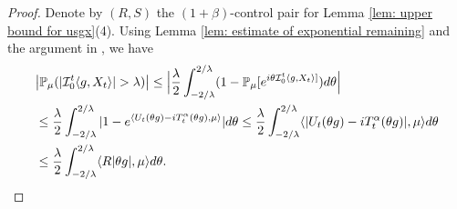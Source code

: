 \documentclass[12pt]{amsart}
\theoremstyle{plain}
\theoremstyle{definition}
\numberwithin{equation}{section}
\begin{document}
\begin{proof}
    Denote by $(R,S)$ the $(1+\beta)$-control pair for Lemma \ref{lem: upper bound for usgx}(4).
    Using Lemma \ref{lem: estimate of exponential remaining} and the argument in \cite[Proof of Theorem 3.3.6]{Durrett2010Probability}, we have
\begin{align}
    &\big|\mathbb P_\mu (|\mathcal{I}_0^t\langle g,X_t\rangle| > \lambda)\big|
    \leq \Big|\frac{\lambda}{2}\int_{-2/\lambda}^{2/\lambda}(1 - \mathbb P_\mu[e^{i\theta \mathcal{I}_0^t\langle g,X_t\rangle]})d\theta\Big|
    \\&\leq \frac{\lambda}{2}\int_{-2/\lambda}^{2/\lambda}|1-e^{\langle U_t(\theta g)-iT_t^{\alpha}(\theta g),\mu \rangle}|d\theta
    \leq \frac{\lambda}{2}\int_{-2/\lambda}^{2/\lambda}\langle |U_t(\theta g) - iT_t^\alpha(\theta g)|,\mu\rangle d\theta
    \\&\leq \frac{\lambda}{2}\int_{-2/\lambda}^{2/\lambda}\langle R|\theta g|,\mu\rangle d\theta.
      \qedhere
\end{align}
\end{proof}
\end{document}

